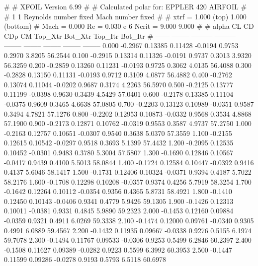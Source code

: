 #  
#       XFOIL         Version 6.99
#  
# Calculated polar for: EPPLER 420 AIRFOIL                              
#  
# 1 1 Reynolds number fixed          Mach number fixed         
#  
# xtrf =   1.000 (top)        1.000 (bottom)  
# Mach =   0.000     Re =     0.030 e 6     Ncrit =   9.000  9.000
#  
#   alpha    CL        CD       CDp       CM     Top_Xtr  Bot_Xtr  Top_Itr  Bot_Itr
#  ------ -------- --------- --------- -------- -------- -------- -------- --------
   0.000  -0.2967   0.13385   0.11428  -0.0194   0.9753   0.2970   3.8205  56.2544
   0.100  -0.2915   0.13314   0.11326  -0.0191   0.9737   0.3013   3.9320  56.3259
   0.200  -0.2859   0.13260   0.11231  -0.0193   0.9725   0.3062   4.0135  56.4088
   0.300  -0.2828   0.13150   0.11131  -0.0193   0.9712   0.3109   4.0877  56.4882
   0.400  -0.2762   0.13074   0.11044  -0.0202   0.9687   0.3174   4.2263  56.5970
   0.500  -0.2125   0.13777   0.11199  -0.0398   0.9630   0.3439   4.5429  57.0401
   0.600  -0.2178   0.13385   0.11104  -0.0375   0.9609   0.3465   4.6638  57.0805
   0.700  -0.2203   0.13123   0.10989  -0.0351   0.9587   0.3494   4.7821  57.1276
   0.800  -0.2202   0.12953   0.10873  -0.0332   0.9568   0.3534   4.8868  57.1900
   0.900  -0.2173   0.12871   0.10762  -0.0319   0.9553   0.3587   4.9737  57.2750
   1.000  -0.2163   0.12757   0.10651  -0.0307   0.9540   0.3638   5.0370  57.3559
   1.100  -0.2155   0.12615   0.10542  -0.0297   0.9518   0.3693   5.1399  57.4432
   1.200  -0.2095   0.12535   0.10452  -0.0301   0.9483   0.3780   5.3004  57.5807
   1.300  -0.1690   0.12846   0.10567  -0.0417   0.9439   0.4100   5.5013  58.0844
   1.400  -0.1724   0.12584   0.10447  -0.0392   0.9416   0.4137   5.6046  58.1417
   1.500  -0.1731   0.12406   0.10324  -0.0371   0.9394   0.4187   5.7022  58.2176
   1.600  -0.1708   0.12298   0.10208  -0.0357   0.9374   0.4256   5.7919  58.3254
   1.700  -0.1642   0.12264   0.10112  -0.0354   0.9356   0.4365   5.8731  58.4921
   1.800  -0.1410   0.12450   0.10143  -0.0406   0.9341   0.4779   5.9426  59.1305
   1.900  -0.1426   0.12313   0.10011  -0.0381   0.9331   0.4845   5.9890  59.2323
   2.000  -0.1453   0.12160   0.09884  -0.0359   0.9321   0.4911   6.0269  59.3338
   2.100  -0.1474   0.12000   0.09761  -0.0340   0.9305   0.4991   6.0889  59.4567
   2.200  -0.1432   0.11935   0.09667  -0.0338   0.9276   0.5155   6.1974  59.7078
   2.300  -0.1494   0.11767   0.09533  -0.0306   0.9253   0.5499   6.2846  60.2397
   2.400  -0.1508   0.11627   0.09389  -0.0282   0.9223   0.5599   6.3992  60.3953
   2.500  -0.1447   0.11599   0.09286  -0.0278   0.9193   0.5793   6.5118  60.6978
